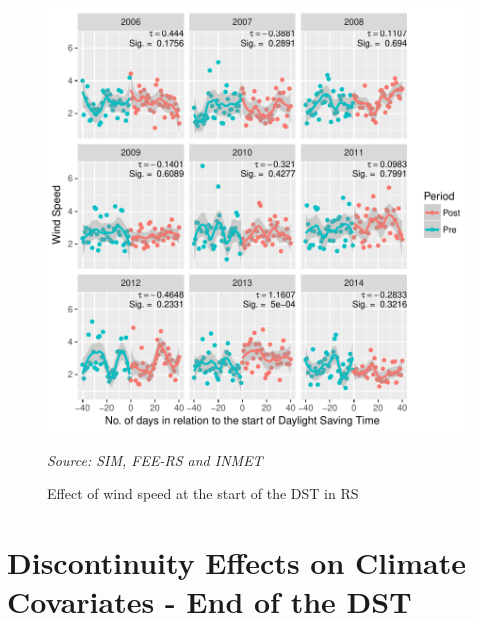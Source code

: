 \documentclass[12pt,openright,oneside,a4paper,english,french,spanish]{abntex2}
\numberwithin{table}{section} %
\numberwithin{figure}{section} %
\newcommand{\source}[1]{\textit{#1}}
\begin{document}
\begin{otherlanguage}{english}
\begin{subappendices}
\begin{figure}[H]
\begin{center}
\includegraphics{TESE_DE_DOUTORADO_RENAN_FINAL-plot_efeito_descontinuo_velocidade_entrada}
\end{center}
\caption{Effect of wind speed at the start of the DST in RS}
\source{Source: SIM, FEE-RS and INMET}
\label{fig:efeito_descon_velo_entrada_RS}
\end{figure}







\section{Discontinuity Effects on Climate Covariates - End of the DST\label{appen:HV_efeito_cov_clima_saida}}


\end{subappendices}
\end{otherlanguage}
\end{document}

